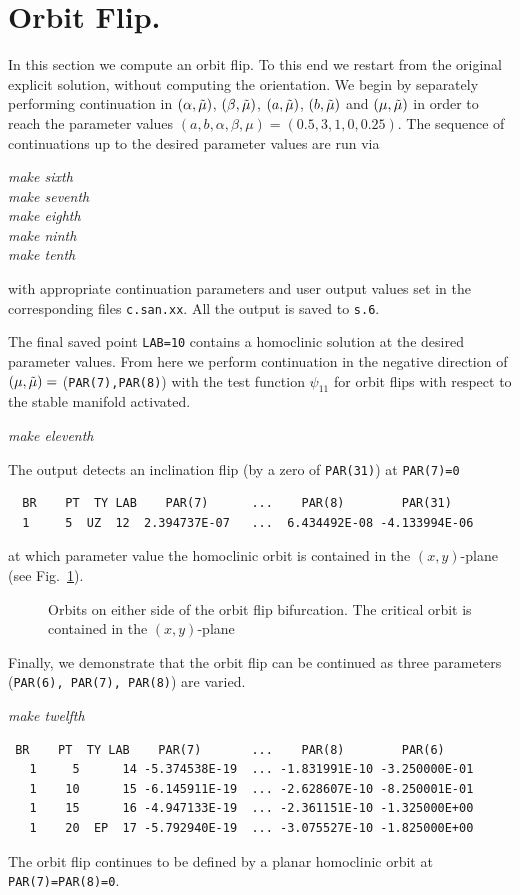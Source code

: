 \documentclass[12pt]{report}
\begin{document}
\section{Orbit Flip.}
In this section we compute an orbit flip. To this end we restart
from the original explicit solution, without computing the orientation. We 
begin by separately performing continuation in $(\alpha,\tilde \mu)$, 
$(\beta,\tilde \mu)$, $(a,\tilde \mu)$, $(b,\tilde \mu)$ and $(\mu, \tilde \mu)$
in order to reach the parameter values 
$(a,b,\alpha,\beta, \mu)=(0.5,3,1,0,0.25)$.
The sequence of continuations up to the desired parameter values 
are run via
\begin{center}
\it make sixth\\
make seventh\\
make eighth\\
make ninth\\ 
make tenth\\
\end{center}
with appropriate continuation parameters and user output values
set in the corresponding files {\tt c.san.xx}. 
All the output is saved to {\tt s.6}.

The final saved point {\tt LAB=10} contains a homoclinic solution at
the desired parameter values. From here we perform continuation in
the negative direction of $(\mu,\tilde \mu)=$ ({\tt PAR(7),PAR(8)}) with
the test function $\psi_{11}$ for orbit flips with respect to the
stable manifold activated.
\begin{center}
\it make eleventh
\end{center}
The output detects an inclination flip (by a zero of {\tt PAR(31)}) 
at {\tt PAR(7)=0} 
\begin{verbatim}
  BR    PT  TY LAB    PAR(7)      ...    PAR(8)        PAR(31)    
  1     5  UZ  12  2.394737E-07   ...  6.434492E-08 -4.133994E-06
\end{verbatim}
at which parameter value the homoclinic orbit is contained in the $(x,y)$-plane
(see Fig.\ \ref{Ftest2}).

\begin{figure}[t]
\epsfysize 9.0cm
\centerline{}
\caption{Orbits on either side of the orbit flip bifurcation. The critical
orbit is contained in the $(x,y)$-plane}
\label{Ftest2}
\end{figure}

Finally, we demonstrate that the orbit flip can be continued as 
three parameters ({\tt PAR(6), PAR(7), PAR(8)}) are varied. 
\begin{center}
\it make twelfth
\end{center}
\begin{verbatim}
 BR    PT  TY LAB    PAR(7)       ...    PAR(8)        PAR(6)     
   1     5      14 -5.374538E-19  ... -1.831991E-10 -3.250000E-01
   1    10      15 -6.145911E-19  ... -2.628607E-10 -8.250001E-01
   1    15      16 -4.947133E-19  ... -2.361151E-10 -1.325000E+00
   1    20  EP  17 -5.792940E-19  ... -3.075527E-10 -1.825000E+00
\end{verbatim}
The orbit flip continues to be defined by a planar homoclinic orbit
at {\tt PAR(7)=PAR(8)=0}.
\end{document}
